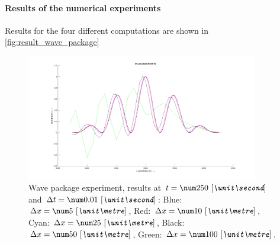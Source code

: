 \paragraph*{Results of the numerical experiments}
Results for the four different computations are shown in \autoref{fig:result_wave_package}
\begin{figure}[H]
    \centering
    \includegraphics[width=0.9\textwidth]{figures/wave_package_250s.png}
    \caption[Wave package experiment]{Wave package experiment, results at $t=\bqty{250}{\second}$ and $\Dt = \bqty{0.01}{\second}$:
        Blue: $\Dx = \bqty{5}{\metre}$,
        Red: $\Dx = \bqty{10}{\metre}$,
        Cyan: $\Dx = \bqty{25}{\metre}$,
        Black: $\Dx = \bqty{50}{\metre}$,
        Green: $\Dx = \bqty{100}{\metre}$.
    }
    \label{fig:result_wave_package}
\end{figure}


